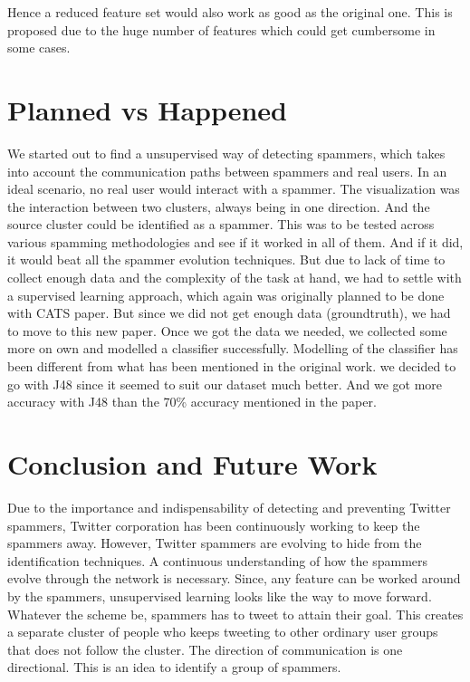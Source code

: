 \documentclass[11pt]{article}
\begin{document}
Hence a reduced feature set would also work as good as the original one. This is proposed due to the huge number of features which could get cumbersome in some cases. 

\section{Planned vs Happened}
We started out to find a unsupervised way of detecting spammers, which takes into account the communication paths between spammers and real users. In an ideal scenario, no real user would interact with a spammer. The visualization was the interaction between two clusters, always being in one direction. And the source cluster could be identified as a spammer. This was to be tested across various spamming methodologies and see if it worked in all of them. And if it did, it would beat all the spammer evolution techniques. But due to lack of time to collect enough data and the complexity of the task at hand, we had to settle with a supervised learning approach, which again was originally planned to be done with CATS paper. But since we did not get enough data (groundtruth), we had to move to this new paper. Once we got the data we needed, we collected some more on own and modelled a classifier successfully. Modelling of the classifier has been different from what has been mentioned in the original work. we decided to go with J48 since it seemed to suit our dataset much better. And we got more accuracy with J48 than the 70\% accuracy mentioned in the paper.

\section{Conclusion and Future Work}

Due to the importance and indispensability of detecting and preventing Twitter spammers, Twitter corporation has been continuously working to keep the spammers away. However, Twitter spammers are evolving to hide from the identification techniques. A continuous understanding of how the spammers evolve through the network is necessary. Since, any feature can be worked around by the spammers, unsupervised learning looks like the way to move forward. Whatever the scheme be, spammers has to tweet to attain their goal.
This creates a separate cluster of people who keeps tweeting to other ordinary user groups that does not follow the cluster. The direction of communication is one directional. This is an idea to identify a group of spammers.
\end{document}
